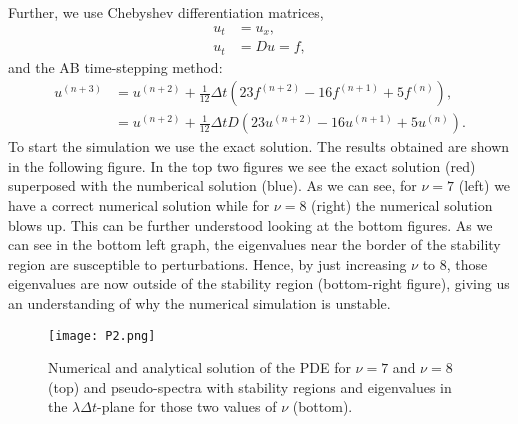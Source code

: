 Further, we use Chebyshev differentiation matrices,
\begin{align*}
u_t &= u_x,\\
u_t &= Du = f,
\end{align*}
and the AB time-stepping method:
\begin{align*}
u^{(n+3)} &= u^{(n+2)}+\frac{1}{12}\Delta t\left(23f^{(n+2)}-16f^{(n+1)}+5f^{(n)}\right),\\
&= u^{(n+2)}+\frac{1}{12}\Delta tD\left(23u^{(n+2)}-16u^{(n+1)}+5u^{(n)}\right).
\end{align*}
To start the simulation we use the exact solution. The results obtained are shown in the following figure. In the top two figures we see the exact solution (red) superposed with the numberical solution (blue). As we can see, for $\nu=7$ (left) we have a correct numerical solution while for $\nu=8$ (right) the numerical solution blows up. This can be further understood looking at the bottom figures. As we can see in the bottom left graph, the eigenvalues near the border of the stability region are susceptible to perturbations. Hence, by just increasing $\nu$ to 8, those eigenvalues are now outside of the stability region (bottom-right figure), giving us an understanding of why the numerical simulation is unstable.
\begin{figure}[H]
\centering
\texttt{[image: P2.png]}\caption{Numerical and analytical solution of the PDE for $\nu = 7$ and $\nu = 8$ (top) and pseudo-spectra with stability regions and eigenvalues in the $\lambda\Delta t$-plane for those two values of $\nu$ (bottom).}
\end{figure}

